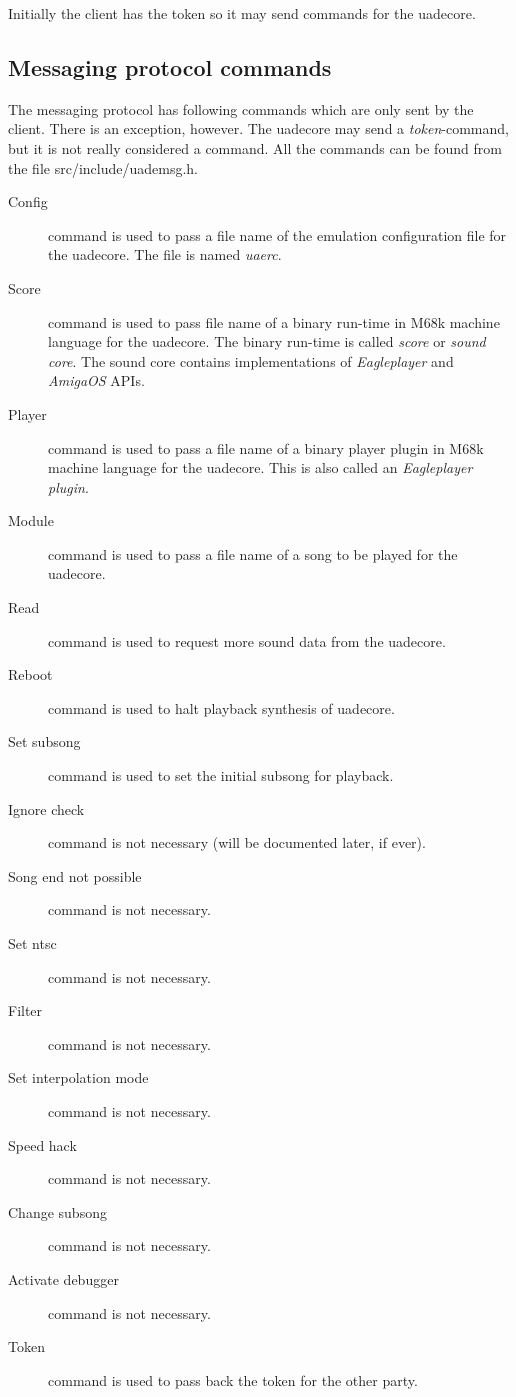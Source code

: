 \documentclass{article}
\begin{document}
Initially the client has the token so it may send commands for the uadecore.

\subsection{Messaging protocol commands}

The messaging protocol has following commands which are only sent by
the client. There is an exception, however. The uadecore may send a
\emph{token}-command, but it is not really considered a command.
All the commands can be found from the file \mbox{src/include/uademsg.h}.

\begin{description}
\item [Config] command is used to pass a file name of the emulation
configuration file for the uadecore. The file is named \emph{uaerc}.

\item [Score] command is used to pass file name of a binary run-time in M68k
machine language for the uadecore. The binary run-time is called
\emph{score} or \emph{sound core}. The sound core contains implementations of
\emph{Eagleplayer} and \emph{AmigaOS} APIs.

\item [Player] command is used to pass a file name of a binary player plugin
in M68k machine language for the uadecore. This is also called an
\emph{Eagleplayer plugin}.

\item [Module] command is used to pass a file name of a song to be played
for the uadecore.

\item [Read] command is used to request more sound data from the uadecore.

\item [Reboot] command is used to halt playback synthesis of uadecore.

\item [Set subsong] command is used to set the initial subsong for playback.

\item [Ignore check] command is not necessary (will be documented later,
if ever).
\item [Song end not possible] command is not necessary.
\item [Set ntsc] command is not necessary.
\item [Filter] command is not necessary.
\item [Set interpolation mode] command is not necessary.
\item [Speed hack] command is not necessary.
\item [Change subsong] command is not necessary.
\item [Activate debugger] command is not necessary.

\item [Token] command is used to pass back the token for the other party.
\end{description}
\end{document}
